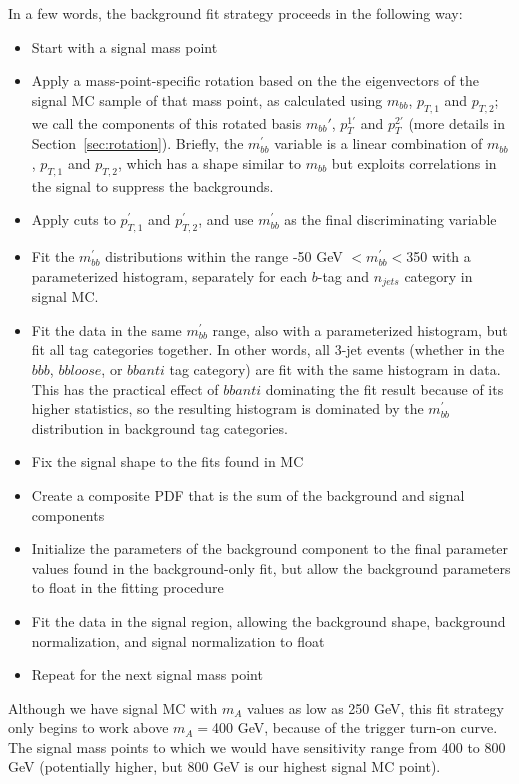 In a few words, the background fit strategy proceeds in the following way:
\begin{itemize}
    \item Start with a signal mass point
    \item Apply a mass-point-specific rotation based on the the eigenvectors of 
    the signal MC sample of that mass point, as calculated using $m_{bb}$, $p_{T,1}$ and $p_{T,2}$; we call 
    the components of this rotated basis $m_{bb}'$, $p_T^{1'}$ and $p_T^{2'}$ (more
    details in Section~\ref{sec:rotation}).  Briefly, the $m^{'}_{bb}$ variable
    is a linear combination of $m_{bb}$, $p_{T,1}$ and $p_{T,2}$, which has a shape
    similar to $m_{bb}$ but exploits correlations in the signal to suppress the backgrounds.
    \item Apply cuts to $p^{'}_{T,1}$ and $p^{'}_{T,2}$, and use $m_{bb}^{'}$ as the final 
    discriminating variable 
    \item Fit the $m_{bb}^{'}$ distributions within the range -50 GeV $<m_{bb}^{'}<$350
    with a parameterized histogram, separately for each $b$-tag and $n_{jets}$ category
    in signal MC.
    \item Fit the data in the same $m_{bb}^{'}$ range, also with a parameterized histogram,
    but fit all tag categories together.  In other words, all 3-jet events (whether in the
    $bbb$, $bbloose$, or $bbanti$ tag category) are fit with the same histogram in data.
    This has the practical effect of $bbanti$ dominating the fit result because of its
    higher statistics, so the resulting
    histogram is dominated by the $m_{bb}^{'}$ distribution in background tag categories.
    \item Fix the signal shape to the fits found in MC
    \item Create a composite PDF that is the sum of the background and signal components
    \item Initialize the parameters of the background component to the final parameter values
    found in the background-only fit, but allow the background parameters to float in 
    the fitting procedure
    \item Fit the data in the signal region, allowing the background shape, background
    normalization, and signal normalization to float
    \item Repeat for the next signal mass point
\end{itemize}

Although we have signal MC with $m_A$ values as low as 250 GeV, this fit strategy only
begins to work above $m_A=$400 GeV, because of the trigger turn-on curve.  The signal mass 
points to which we would have sensitivity range from 400 to 800 GeV (potentially higher,
but 800 GeV is our highest signal MC point). 

